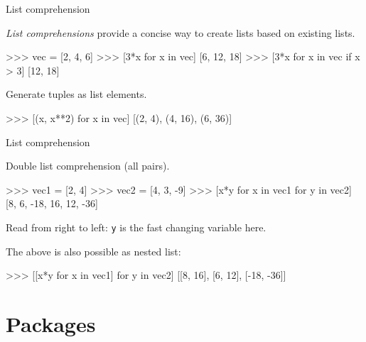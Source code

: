 \documentclass[xetex,10pt]{beamer}
\def\pythoni{\lstinline[language=pythontim]}
\def\spacer{\vspace*{1em}}
\begin{document}
\begin{frame}[fragile]{List comprehension}

\emph{List comprehensions} provide a concise way to create lists based on existing lists.
	
\begin{python}
>>> vec = [2, 4, 6]
>>> [3*x for x in vec]
[6, 12, 18]
>>> [3*x for x in vec if x > 3]
[12, 18]
\end{python}

\pause
Generate tuples as list elements.

\begin{python}
>>> [(x, x**2) for x in vec]
[(2, 4), (4, 16), (6, 36)]
\end{python}

\end{frame}

\begin{frame}[fragile]{List comprehension}

Double list comprehension (all pairs).

\begin{python}
>>> vec1 = [2, 4]
>>> vec2 = [4, 3, -9]
>>> [x*y for x in vec1 for y in vec2]
[8, 6, -18, 16, 12, -36]
\end{python}

Read from right to left: \pythoni{y} is the fast changing variable here.

\pause
\spacer

The above is also possible as nested list:

\begin{python}
>>> [[x*y for x in vec1] for y in vec2]
[[8, 16], [6, 12], [-18, -36]]
\end{python}

\end{frame}


\section{Packages}
\end{document}
